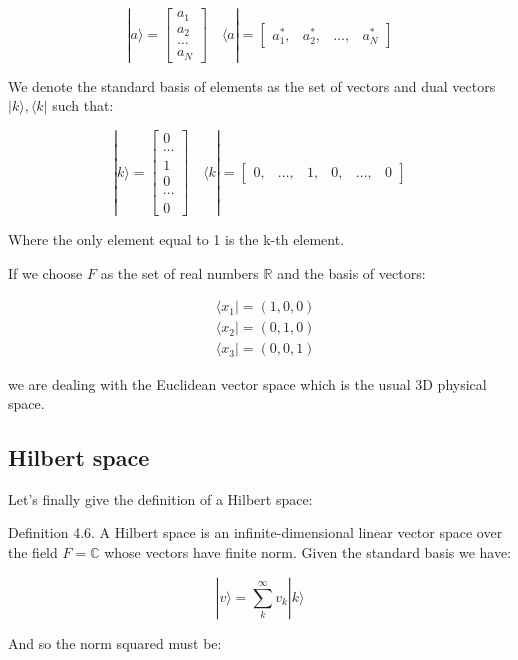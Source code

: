\documentclass[italian]{HKNdocument}
\begin{document}
\[
|a\rangle = \begin{bmatrix}
a_1 \\
a_2 \\
\ldots \\
a_N
\end{bmatrix} \quad
\langle a| = \begin{bmatrix}
a_1^*, & a_2^*, & \ldots, & a_N^*
\end{bmatrix}
\]

We denote the standard basis of elements as the set of vectors and dual vectors $|k\rangle, \langle k|$ such that:

\[
|k\rangle = \begin{bmatrix}
0 \\
\cdots \\
1 \\
0 \\
\cdots \\
0
\end{bmatrix} \quad
\langle k| = \begin{bmatrix}
0, & \ldots, & 1, & 0, & \ldots, & 0
\end{bmatrix}
\]

Where the only element equal to 1 is the k-th element.

If we choose $F$ as the set of real numbers $\mathbb{R}$ and the basis of vectors:

\begin{align}
&\langle x_1| = (1,0,0) \\
&\langle x_2| = (0,1,0)  \\
&\langle x_3| = (0,0,1)
\end{align}

we are dealing with the Euclidean vector space which is the usual 3D physical space.


\subsection{Hilbert space}

Let's finally give the definition of a Hilbert space:

Definition 4.6. A Hilbert space is an infinite-dimensional linear vector space over the field $F = \mathbb{C}$ whose vectors have finite norm. Given the standard basis we have:

\begin{equation}
|v\rangle = \sum_{k}^{\infty} v_k|k\rangle
\end{equation}

And so the norm squared must be:
\end{document}
